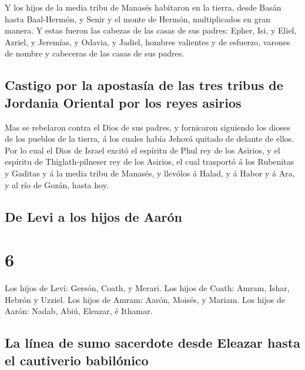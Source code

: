  Y los hijos de la media tribu de Manasés habitaron en la
tierra, desde Basán hasta Baal-Hermón, y Senir y el monte de Hermón,
multiplicados en gran manera.  Y estas fueron las cabezas
de las casas de sus padres: Epher, Isi, y Eliel, Azriel, y Jeremías, y
Odavia, y Jadiel, hombres valientes y de esfuerzo, varones de nombre y
cabeceras de las casas de sus padres.

\hypertarget{castigo-por-la-apostasuxeda-de-las-tres-tribus-de-jordania-oriental-por-los-reyes-asirios}{%
\subsection{Castigo por la apostasía de las tres tribus de Jordania
Oriental por los reyes
asirios}\label{castigo-por-la-apostasuxeda-de-las-tres-tribus-de-jordania-oriental-por-los-reyes-asirios}}

 Mas se rebelaron contra el Dios de sus padres, y
fornicaron siguiendo los dioses de los pueblos de la tierra, á los
cuales había Jehová quitado de delante de ellos.  Por lo
cual el Dios de Israel excitó el espíritu de Phul rey de los Asirios, y
el espíritu de Thiglath-pilneser rey de los Asirios, el cual trasportó á
los Rubenitas y Gaditas y á la media tribu de Manasés, y llevólos á
Halad, y á Habor y á Ara, y al río de Gozán, hasta hoy.

\hypertarget{de-levi-a-los-hijos-de-aaruxf3n}{%
\subsection{De Levi a los hijos de
Aarón}\label{de-levi-a-los-hijos-de-aaruxf3n}}

\hypertarget{section-5}{%
\section{6}\label{section-5}}

 Los hijos de Leví: Gersón, Coath, y Merari.
 Los hijos de Coath: Amram, Ishar, Hebrón y Uzziel.
 Los hijos de Amram: Aarón, Moisés, y Mariam. Los hijos de
Aarón: Nadab, Abiú, Eleazar, é Ithamar.

\hypertarget{la-luxednea-de-sumo-sacerdote-desde-eleazar-hasta-el-cautiverio-babiluxf3nico}{%
\subsection{La línea de sumo sacerdote desde Eleazar hasta el cautiverio
babilónico}\label{la-luxednea-de-sumo-sacerdote-desde-eleazar-hasta-el-cautiverio-babiluxf3nico}}

